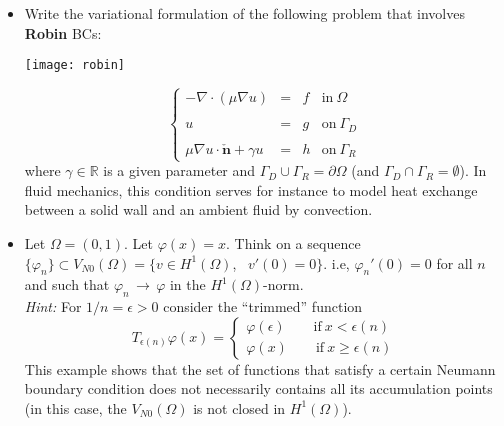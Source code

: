 \begin{kaobox}[frametitle=Solve the following exercices]
\begin{itemize}
\item Write the variational formulation of the following problem
that involves \textbf{Robin} BCs:
\begin{marginfigure}[0.5cm]
\begin{center}
	\texttt{[image: robin]}
\end{center}
\end{marginfigure}
\begin{equation}
\left\{
\begin{array}{rcll}
-\nabla \cdot \left ( \mu \nabla{u} \right) & = & f & \mbox{in}~\Omega \\
& & & \\
u & = & g & \mbox{on}~\Gamma_D \\
& & & \\
\mu \nabla{u} \cdot \check{\mathbf{n}} + \gamma u & = & h & \mbox{on}~\Gamma_R
\end{array}
\right.\nonumber
\end{equation}
where $\gamma \in \mathbb{R}$ is a given parameter and
$\Gamma_D \cup \Gamma_R = \partial{\Omega}$
(and $\Gamma_D \cap \Gamma_R = \emptyset$).
In fluid mechanics, this condition serves for instance
to model heat exchange between a solid wall and an ambient
fluid by convection. \\


\item Let $\Omega=(0,1)$. Let $\varphi(x)=x$.
Think on a sequence $\{\varphi_n\}\subset V_{N0}(\Omega) = \{v \in H^1(\Omega)$,~
$v'(0)=0\}$. i.e, $\varphi_n'(0) = 0$ for all $n$ and such that
$\varphi_n\,\to\,\varphi$ in the $H^1(\Omega)$-norm.\\
{\em Hint:} For $1/n=\epsilon>0$ consider the ``trimmed'' function
$$
T_{\epsilon(n)}\varphi(x) = \begin{cases}
\varphi(\epsilon)\qquad\mbox{if}~x<\epsilon(n)\\
\varphi(x)\qquad\mbox{if}~x\geq\epsilon(n)
\end{cases}
$$
This example shows that the set of functions that satisfy
a certain Neumann boundary condition does not necessarily contains all
its accumulation points (in this case, the $V_{N0}(\Omega)$ is not closed in $H^1(\Omega)$). \\


\end{itemize}
\end{kaobox}
